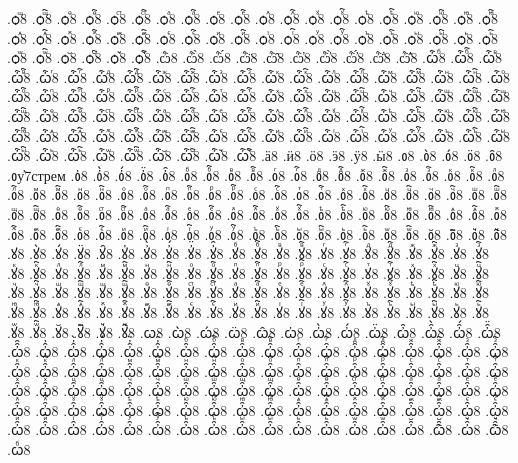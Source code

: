 {.ѻⷳ8
.ѻⷳ҇8
.ѻⷴ8
.ѻⷴ҇8
.ѻⷵ8
.ѻⷵ҇8
.ѻⷶ8
.ѻⷶ҇8
.ѻⷷ8
.ѻⷷ҇8
.ѻⷸ8
.ѻⷸ҇8
.ѻⷹ8
.ѻⷹ҇8
.ѻⷺ8
.ѻⷺ҇8
.ѻⷻ8
.ѻⷻ҇8
.ѻⷼ8
.ѻⷼ҇8
.ѻⷽ8
.ѻⷽ҇8
.ѻⷾ8
.ѻⷾ҇8
.ѻⷿ8
.ѻⷿ҇8
.ѻꙴ8
.ѻꙴ҇8
.ѻꙵ8
.ѻꙵ҇8
.ѻꙶ8
.ѻꙶ҇8
.ѻꙷ8
.ѻꙷ҇8
.ѻꙸ8
.ѻꙸ҇8
.ѻꙹ8
.ѻꙹ҇8
.ѻꙺ8
.ѻꙺ҇8
.ѻꙻ8
.ѻꙻ҇8
.ѻ꙼8
.ѻ꙼҇8
.ѻ꙽8
.ѻ꙽҇8
.ѽ8
.ѽ̀8
.ѽ́8
.ѽ̈8
.ѽ̑8
.ѽ҆8
.ѽ҆̀8
.ѽ҆́8
.ѽ҆̈8
.ѽ҆̑8
.ѽⷠ8
.ѽⷠ҇8
.ѽⷡ8
.ѽⷡ҇8
.ѽⷢ8
.ѽⷢ҇8
.ѽⷣ8
.ѽⷣ҇8
.ѽⷤ8
.ѽⷤ҇8
.ѽⷥ8
.ѽⷥ҇8
.ѽⷦ8
.ѽⷦ҇8
.ѽⷧ8
.ѽⷧ҇8
.ѽⷨ8
.ѽⷨ҇8
.ѽⷩ8
.ѽⷩ҇8
.ѽⷪ8
.ѽⷪ҇8
.ѽⷫ8
.ѽⷫ҇8
.ѽⷬ8
.ѽⷬ҇8
.ѽⷭ8
.ѽⷭ҇8
.ѽⷮ8
.ѽⷮ҇8
.ѽⷯ8
.ѽⷯ҇8
.ѽⷰ8
.ѽⷰ҇8
.ѽⷱ8
.ѽⷱ҇8
.ѽⷲ8
.ѽⷲ҇8
.ѽⷳ8
.ѽⷳ҇8
.ѽⷴ8
.ѽⷴ҇8
.ѽⷵ8
.ѽⷵ҇8
.ѽⷶ8
.ѽⷶ҇8
.ѽⷷ8
.ѽⷷ҇8
.ѽⷸ8
.ѽⷸ҇8
.ѽⷹ8
.ѽⷹ҇8
.ѽⷺ8
.ѽⷺ҇8
.ѽⷻ8
.ѽⷻ҇8
.ѽⷼ8
.ѽⷼ҇8
.ѽⷽ8
.ѽⷽ҇8
.ѽⷾ8
.ѽⷾ҇8
.ѽⷿ8
.ѽⷿ҇8
.ѽꙴ8
.ѽꙴ҇8
.ѽꙵ8
.ѽꙵ҇8
.ѽꙶ8
.ѽꙶ҇8
.ѽꙷ8
.ѽꙷ҇8
.ѽꙸ8
.ѽꙸ҇8
.ѽꙹ8
.ѽꙹ҇8
.ѽꙺ8
.ѽꙺ҇8
.ѽꙻ8
.ѽꙻ҇8
.ѽ꙼8
.ѽ꙼҇8
.ѽ꙽8
.ѽ꙽҇8
.ӓ8
.ӥ8
.ӧ8
.ӭ8
.ӱ8
.ӹ8
.ᲂ8
.ᲂ̀8
.ᲂ́8
.ᲂ̈8
.ᲂ̑8
.ᲂу҆7стрем
.ᲂ҆8
.ᲂ҆̀8
.ᲂ҆́8
.ᲂ҆̈8
.ᲂ҆̑8
.ᲂⷠ8
.ᲂⷠ҇8
.ᲂⷡ8
.ᲂⷡ҇8
.ᲂⷢ8
.ᲂⷢ҇8
.ᲂⷣ8
.ᲂⷣ҇8
.ᲂⷤ8
.ᲂⷤ҇8
.ᲂⷥ8
.ᲂⷥ҇8
.ᲂⷦ8
.ᲂⷦ҇8
.ᲂⷧ8
.ᲂⷧ҇8
.ᲂⷨ8
.ᲂⷨ҇8
.ᲂⷩ8
.ᲂⷩ҇8
.ᲂⷪ8
.ᲂⷪ҇8
.ᲂⷫ8
.ᲂⷫ҇8
.ᲂⷬ8
.ᲂⷬ҇8
.ᲂⷭ8
.ᲂⷭ҇8
.ᲂⷮ8
.ᲂⷮ҇8
.ᲂⷯ8
.ᲂⷯ҇8
.ᲂⷰ8
.ᲂⷰ҇8
.ᲂⷱ8
.ᲂⷱ҇8
.ᲂⷲ8
.ᲂⷲ҇8
.ᲂⷳ8
.ᲂⷳ҇8
.ᲂⷴ8
.ᲂⷴ҇8
.ᲂⷵ8
.ᲂⷵ҇8
.ᲂⷶ8
.ᲂⷶ҇8
.ᲂⷷ8
.ᲂⷷ҇8
.ᲂⷸ8
.ᲂⷸ҇8
.ᲂⷹ8
.ᲂⷹ҇8
.ᲂⷺ8
.ᲂⷺ҇8
.ᲂⷻ8
.ᲂⷻ҇8
.ᲂⷼ8
.ᲂⷼ҇8
.ᲂⷽ8
.ᲂⷽ҇8
.ᲂⷾ8
.ᲂⷾ҇8
.ᲂⷿ8
.ᲂⷿ҇8
.ᲂꙴ8
.ᲂꙴ҇8
.ᲂꙵ8
.ᲂꙵ҇8
.ᲂꙶ8
.ᲂꙶ҇8
.ᲂꙷ8
.ᲂꙷ҇8
.ᲂꙸ8
.ᲂꙸ҇8
.ᲂꙹ8
.ᲂꙹ҇8
.ᲂꙺ8
.ᲂꙺ҇8
.ᲂꙻ8
.ᲂꙻ҇8
.ᲂ꙼8
.ᲂ꙼҇8
.ᲂ꙽8
.ᲂ꙽҇8
.ꙋ8
.ꙋ̀8
.ꙋ́8
.ꙋ̈8
.ꙋ̑8
.ꙋ҆8
.ꙋ҆̀8
.ꙋ҆́8
.ꙋ҆̈8
.ꙋ҆̑8
.ꙋⷠ8
.ꙋⷠ҇8
.ꙋⷡ8
.ꙋⷡ҇8
.ꙋⷢ8
.ꙋⷢ҇8
.ꙋⷣ8
.ꙋⷣ҇8
.ꙋⷤ8
.ꙋⷤ҇8
.ꙋⷥ8
.ꙋⷥ҇8
.ꙋⷦ8
.ꙋⷦ҇8
.ꙋⷧ8
.ꙋⷧ҇8
.ꙋⷨ8
.ꙋⷨ҇8
.ꙋⷩ8
.ꙋⷩ҇8
.ꙋⷪ8
.ꙋⷪ҇8
.ꙋⷫ8
.ꙋⷫ҇8
.ꙋⷬ8
.ꙋⷬ҇8
.ꙋⷭ8
.ꙋⷭ҇8
.ꙋⷮ8
.ꙋⷮ҇8
.ꙋⷯ8
.ꙋⷯ҇8
.ꙋⷰ8
.ꙋⷰ҇8
.ꙋⷱ8
.ꙋⷱ҇8
.ꙋⷲ8
.ꙋⷲ҇8
.ꙋⷳ8
.ꙋⷳ҇8
.ꙋⷴ8
.ꙋⷴ҇8
.ꙋⷵ8
.ꙋⷵ҇8
.ꙋⷶ8
.ꙋⷶ҇8
.ꙋⷷ8
.ꙋⷷ҇8
.ꙋⷸ8
.ꙋⷸ҇8
.ꙋⷹ8
.ꙋⷹ҇8
.ꙋⷺ8
.ꙋⷺ҇8
.ꙋⷻ8
.ꙋⷻ҇8
.ꙋⷼ8
.ꙋⷼ҇8
.ꙋⷽ8
.ꙋⷽ҇8
.ꙋⷾ8
.ꙋⷾ҇8
.ꙋⷿ8
.ꙋⷿ҇8
.ꙋꙴ8
.ꙋꙴ҇8
.ꙋꙵ8
.ꙋꙵ҇8
.ꙋꙶ8
.ꙋꙶ҇8
.ꙋꙷ8
.ꙋꙷ҇8
.ꙋꙸ8
.ꙋꙸ҇8
.ꙋꙹ8
.ꙋꙹ҇8
.ꙋꙺ8
.ꙋꙺ҇8
.ꙋꙻ8
.ꙋꙻ҇8
.ꙋ꙼8
.ꙋ꙼҇8
.ꙋ꙽8
.ꙋ꙽҇8
.ꙍ8
.ꙍ̀8
.ꙍ́8
.ꙍ̈8
.ꙍ̑8
.ꙍ҆8
.ꙍ҆̀8
.ꙍ҆́8
.ꙍ҆̈8
.ꙍ҆̑8
.ꙍ҆̑̀8
.ꙍ҆̑́8
.ꙍ҆̑̈8
.ꙍ҆̑̑8
.ꙍ҆̑҆8
.ꙍ҆̑҆̀8
.ꙍ҆̑҆́8
.ꙍ҆̑҆̈8
.ꙍ҆̑҆̑8
.ꙍ҆̑ⷠ8
.ꙍ҆̑ⷠ҇8
.ꙍ҆̑ⷡ8
.ꙍ҆̑ⷡ҇8
.ꙍ҆̑ⷢ8
.ꙍ҆̑ⷢ҇8
.ꙍ҆̑ⷣ8
.ꙍ҆̑ⷣ҇8
.ꙍ҆̑ⷤ8
.ꙍ҆̑ⷤ҇8
.ꙍ҆̑ⷥ8
.ꙍ҆̑ⷥ҇8
.ꙍ҆̑ⷦ8
.ꙍ҆̑ⷦ҇8
.ꙍ҆̑ⷧ8
.ꙍ҆̑ⷧ҇8
.ꙍ҆̑ⷨ8
.ꙍ҆̑ⷨ҇8
.ꙍ҆̑ⷩ8
.ꙍ҆̑ⷩ҇8
.ꙍ҆̑ⷪ8
.ꙍ҆̑ⷪ҇8
.ꙍ҆̑ⷫ8
.ꙍ҆̑ⷫ҇8
.ꙍ҆̑ⷬ8
.ꙍ҆̑ⷬ҇8
.ꙍ҆̑ⷭ8
.ꙍ҆̑ⷭ҇8
.ꙍ҆̑ⷮ8
.ꙍ҆̑ⷮ҇8
.ꙍ҆̑ⷯ8
.ꙍ҆̑ⷯ҇8
.ꙍ҆̑ⷰ8
.ꙍ҆̑ⷰ҇8
.ꙍ҆̑ⷱ8
.ꙍ҆̑ⷱ҇8
.ꙍ҆̑ⷲ8
.ꙍ҆̑ⷲ҇8
.ꙍ҆̑ⷳ8
.ꙍ҆̑ⷳ҇8
.ꙍ҆̑ⷴ8
.ꙍ҆̑ⷴ҇8
.ꙍ҆̑ⷵ8
.ꙍ҆̑ⷵ҇8
.ꙍ҆̑ⷶ8
.ꙍ҆̑ⷶ҇8
.ꙍ҆̑ⷷ8
.ꙍ҆̑ⷷ҇8
.ꙍ҆̑ⷸ8
.ꙍ҆̑ⷸ҇8
.ꙍ҆̑ⷹ8
.ꙍ҆̑ⷹ҇8
.ꙍ҆̑ⷺ8
.ꙍ҆̑ⷺ҇8
.ꙍ҆̑ⷻ8
.ꙍ҆̑ⷻ҇8
.ꙍ҆̑ⷼ8
.ꙍ҆̑ⷼ҇8
.ꙍ҆̑ⷽ8
.ꙍ҆̑ⷽ҇8
.ꙍ҆̑ⷾ8
.ꙍ҆̑ⷾ҇8
.ꙍ҆̑ⷿ8
.ꙍ҆̑ⷿ҇8
.ꙍ҆̑ꙴ8
.ꙍ҆̑ꙴ҇8
.ꙍ҆̑ꙵ8
.ꙍ҆̑ꙵ҇8
.ꙍ҆̑ꙶ8
.ꙍ҆̑ꙶ҇8
.ꙍ҆̑ꙷ8
.ꙍ҆̑ꙷ҇8
.ꙍ҆̑ꙸ8
.ꙍ҆̑ꙸ҇8
.ꙍ҆̑ꙹ8
.ꙍ҆̑ꙹ҇8
.ꙍ҆̑ꙺ8
.ꙍ҆̑ꙺ҇8
.ꙍ҆̑ꙻ8
.ꙍ҆̑ꙻ҇8
.ꙍ҆̑꙼8
.ꙍ҆̑꙼҇8
.ꙍ҆̑꙽8
.ꙍ҆̑꙽҇8
.ꙍⷠ8
}
